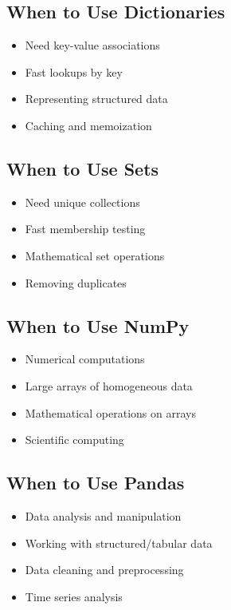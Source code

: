 \documentclass[12pt,a4paper]{book}
\begin{document}
\subsection{When to Use Dictionaries}
\begin{itemize}
    \item Need key-value associations
    \item Fast lookups by key
    \item Representing structured data
    \item Caching and memoization
\end{itemize}

\subsection{When to Use Sets}
\begin{itemize}
    \item Need unique collections
    \item Fast membership testing
    \item Mathematical set operations
    \item Removing duplicates
\end{itemize}

\subsection{When to Use NumPy}
\begin{itemize}
    \item Numerical computations
    \item Large arrays of homogeneous data
    \item Mathematical operations on arrays
    \item Scientific computing
\end{itemize}

\subsection{When to Use Pandas}
\begin{itemize}
    \item Data analysis and manipulation
    \item Working with structured/tabular data
    \item Data cleaning and preprocessing
    \item Time series analysis
\end{itemize}
\end{document}
